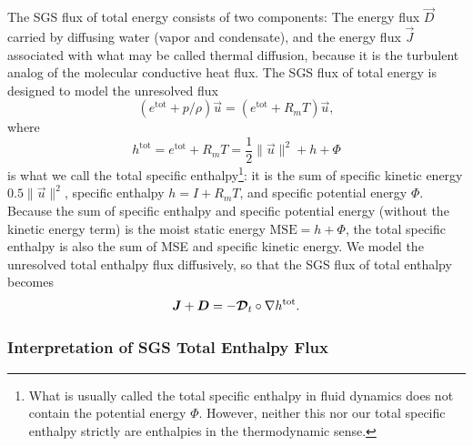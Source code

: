 \documentclass{report}
\begin{document}
The SGS flux of total energy consists of two components: The energy flux $\vec{D}$ carried by diffusing water (vapor and condensate), and the energy flux $\vec{J}$ associated with what may be called thermal diffusion, because it is the turbulent analog of the molecular conductive heat flux. The SGS flux of total energy is designed to model the unresolved flux 
\[
(e^{\mathrm{tot}} + p/\rho) \vec{u} = (e^{\mathrm{tot}} + R_m T) \vec{u}, 
\]
where
\begin{equation}\label{e:total_enthalpy}
h^{\mathrm{tot}} = e^{\mathrm{tot}} + R_m T = \frac{1}{2} \| \vec{u} \|^2 + h + \Phi
\end{equation}
is what we call the total specific enthalpy\footnote{What is usually called the total specific enthalpy in fluid dynamics does not contain the potential energy $\Phi$. However, neither this nor our total specific enthalpy strictly are enthalpies in the thermodynamic sense.}: it is the sum of specific kinetic energy $0.5 \| \vec{u} \|^2$, specific enthalpy $h = I + R_m T$, and specific potential energy $\Phi$. Because the sum of specific enthalpy and specific potential energy (without the kinetic energy term) is the moist static energy $\mathrm{MSE} = h + \Phi$, the total specific enthalpy is also the sum of MSE and specific kinetic energy. We model the unresolved total enthalpy flux diffusively, so that the SGS flux of total enthalpy becomes
\begin{equation}\label{e:SGS_energy_flux}
\boldsymbol{{J}} + \boldsymbol{{D}} = - \boldsymbol{{\mathcal{D}}}_t \circ \nabla h^{\mathrm{tot}}.
\end{equation}

\subsubsection{Interpretation of SGS Total Enthalpy Flux}
\end{document}
